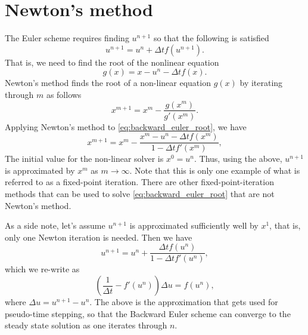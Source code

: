 \documentclass[oneside,a4paper,11pt]{report}
\begin{document}
\section{Newton's method}
The Euler scheme requires finding $u^{n+1}$ so that the following is satisfied 
\begin{equation}
    u^{n+1} = u^n + \Delta t f(u^{n+1}).
\end{equation}
That is, we need to find the root of the nonlinear equation 
\begin{equation}
\label{eq:backward_euler_root}
    g(x) = x - u^n - \Delta t f(x).
\end{equation}
Newton's method finds the root of a non-linear equation $g(x)$ by iterating through $m$ as follows
\begin{equation}
    x^{m+1}=x^m - \frac{g(x^m)}{g'(x^m)}.
\end{equation}
Applying Newton's method to \cref{eq:backward_euler_root}, we have
\begin{equation}
\label{eq:backward_euler_newtons_method_scalar}
    x^{m+1} = x^m - \frac{x^m - u^n - \Delta t f(x^m)}{1 - \Delta t f'(x^m)},
\end{equation}
The initial value for the non-linear solver is $x^0 = u^n$. Thus, using the above, $u^{n+1}$ is approximated by $x^m$ as $m\to\infty$. Note that this is only one example of what is referred to as a fixed-point iteration. There are other fixed-point-iteration methods that can be used to solve \cref{eq:backward_euler_root} that are not Newton's method.

As a side note, let's assume $u^{n+1}$ is approximated sufficiently well by $x^1$, that is, only one Newton iteration is needed. Then we have
\begin{equation}
    u^{n+1} = u^n + \frac{\Delta t f(u^n)}{1 - \Delta t f'(u^n)}, 
\end{equation}
which we re-write as
\begin{equation}
\label{eq:backward_euler_pseudotime_stepping_scalar}
    \left ( \frac{1}{\Delta t} - f'(u^n) \right ) \Delta u = f(u^n),
\end{equation}
where $\Delta u = u^{n+1} - u^n$. The above is the approximation that gets used for pseudo-time stepping, so that the Backward Euler scheme can converge to the steady state solution as one iterates through $n$.
\end{document}
